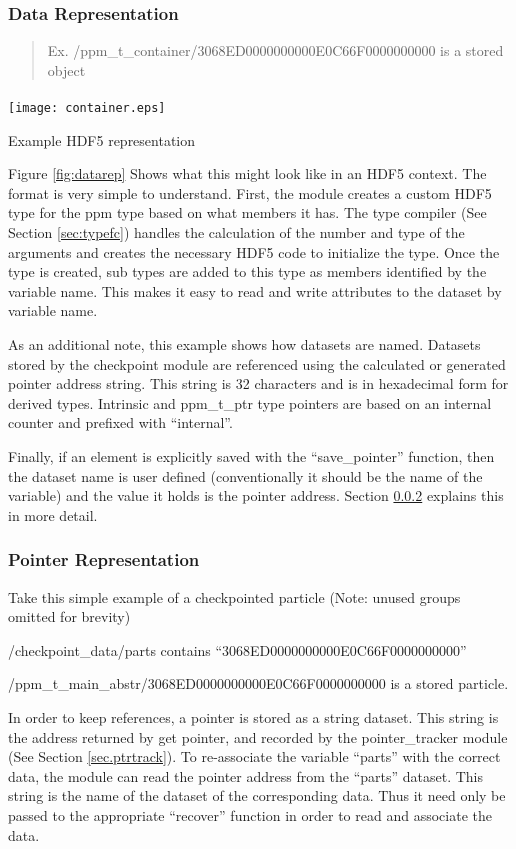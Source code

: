 \documentclass{article}
\begin{document}
\subsubsection{Data Representation}
\begin{quote}
Ex. /ppm\_t\_container/3068ED0000000000E0C66F0000000000 is a stored object
\end{quote}
\paragraph{}
\begin{floatingfigure}[r]{0.2\textwidth}
   \centering
   \texttt{[image: container.eps]}
   \caption{Example HDF5 representation}
   \label{fig:datarep}
\end{floatingfigure}
Figure \ref{fig:datarep} Shows what this might look like in an HDF5 context. The format is very simple to understand. First, the module creates a custom HDF5 type for the ppm type based on what members it has. The type compiler (See Section \ref{sec:typefc}) handles the calculation of the number and type of the arguments and creates the necessary HDF5 code to initialize the type. Once the type is created, sub types are added to this type as members identified by the variable name. This makes it easy to read and write attributes to the dataset by variable name.

As an additional note, this example shows how datasets are named. Datasets stored by the checkpoint module are referenced using the calculated or generated pointer address string. This string is 32 characters and is in hexadecimal form for derived types. Intrinsic and ppm\_t\_ptr type pointers are based on an internal counter and prefixed with ``internal''.

Finally, if an element is explicitly saved with the ``save\_pointer'' function, then the dataset name is user defined (conventionally it should be the name of the variable) and the value it holds is the pointer address. Section \ref{sec:ptrrep} explains this in more detail.

\subsubsection{Pointer Representation}
\label{sec:ptrrep}
Take this simple example of a checkpointed particle (Note: unused groups omitted for brevity)
\begin{list}{}{}
\item /checkpoint\_data/parts contains ``3068ED0000000000E0C66F0000000000''
\item /ppm\_t\_main\_abstr/3068ED0000000000E0C66F0000000000 is a stored particle.
\end{list}
In order to keep references, a pointer is stored as a string dataset. This string is the address returned by get pointer, and recorded by the pointer\_tracker module (See Section \ref{sec.ptrtrack}). To re-associate the variable ``parts'' with the correct data, the module can read the pointer address from the ``parts'' dataset. This string is the name of the dataset of the corresponding data. Thus it need only be passed to the appropriate ``recover'' function in order to read and associate the data.
\end{document}
